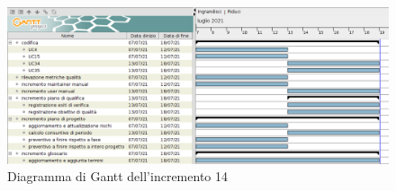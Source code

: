 \pagebreak
{}
\begin{figure}[!ht]
    \caption{Diagramma di Gantt dell'incremento 14}
    \vspace{5px}
    \includegraphics[scale=0.3]{../../../Images/Diagrammi/Gantt/incremento14.png}
    \centering
\end{figure}

